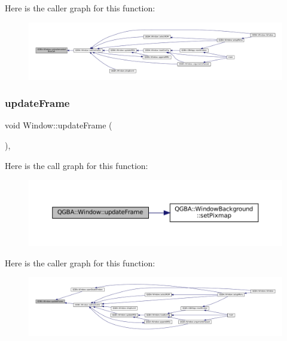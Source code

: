 Here is the caller graph for this function\+:
\nopagebreak
\begin{figure}[H]
\begin{center}
\leavevmode
\includegraphics[width=350pt]{class_q_g_b_a_1_1_window_a9364322857735a4bca2b01f69955b123_icgraph}
\end{center}
\end{figure}
\mbox{\label{class_q_g_b_a_1_1_window_a515e9d32237b1340e77b02a08789783c}} 
\subsubsection{\texorpdfstring{update\+Frame}{updateFrame}}
{\footnotesize\ttfamily void Window\+::update\+Frame (\begin{DoxyParamCaption}{ }\end{DoxyParamCaption})\hspace{0.3cm}{\ttfamily [private]}, {\ttfamily [slot]}}

Here is the call graph for this function\+:
\nopagebreak
\begin{figure}[H]
\begin{center}
\leavevmode
\includegraphics[width=350pt]{class_q_g_b_a_1_1_window_a515e9d32237b1340e77b02a08789783c_cgraph}
\end{center}
\end{figure}
Here is the caller graph for this function\+:
\nopagebreak
\begin{figure}[H]
\begin{center}
\leavevmode
\includegraphics[width=350pt]{class_q_g_b_a_1_1_window_a515e9d32237b1340e77b02a08789783c_icgraph}
\end{center}
\end{figure}
\mbox{\label{class_q_g_b_a_1_1_window_ac9d1c0d541f7088a9595e3a6bbb7992a}} 
